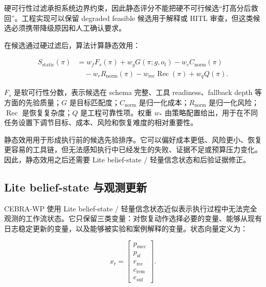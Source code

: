 硬可行性过滤承担系统边界约束，因此静态评分不能把硬不可行候选``打高分后救回''。工程实现可以保留
degraded feasible 候选用于解释或 HITL
审查，但这类候选必须携带降级原因和人工确认要求。

在候选通过硬过滤后，算法计算静态效用：

\begin{equation}
\begin{aligned}
S_{\mathrm{static}}(\pi)
  &= w_f F_s(\pi)
   + w_g G(\pi;g,o_t)
   - w_c C_{\mathrm{norm}}(\pi)\\
  &\quad{}- w_r R_{\mathrm{norm}}(\pi)
   - w_{\mathrm{rec}}\operatorname{Rec}(\pi)
   + w_q Q(\pi).
\end{aligned}
\end{equation}

\begin{symboldefs}
\end{symboldefs}

$F_s$ 是软可行性分数，表示候选在 schema 完整、工具
readiness、fallback depth 等方面的先验质量；$G$
是目标匹配度；$C_{\mathrm{norm}}$ 是归一化成本；$R_{\mathrm{norm}}$
是归一化风险；$\operatorname{Rec}$ 是恢复复杂度；$Q$ 是工程可靠性项。权重
$w_\ast$
由策略配置给出，用于在不同任务设置下调节目标、成本、风险和恢复难度的相对重要性。

静态效用用于形成执行前的候选先验排序。它可以偏好成本更低、风险更小、恢复更容易的工具链，但无法感知执行中已经发生的失败、证据不足或预算压力变化。因此，静态效用之后还需要
Lite belief-state / 轻量信念状态和后验证据修正。

\subsection{Lite belief-state
与观测更新}\label{lite-belief-state-ux4e0eux89c2ux6d4bux66f4ux65b0}

CEBRA-WP 使用 Lite belief-state /
轻量信念状态近似表示执行过程中无法完全观测的工作流状态。它只保留三类变量：对恢复动作选择必要的变量、能够从现有日志稳定更新的变量，以及能够被实验和案例解释的变量。状态向量定义为：

\begin{equation}
x_t=\left[
\begin{array}{c}
p_{\mathrm{succ}}\\
p_{\mathrm{sf}}\\
r_{\mathrm{rec}}\\
c_{\mathrm{rem}}\\
e_{\mathrm{suf}}
\end{array}
\right].
\end{equation}

